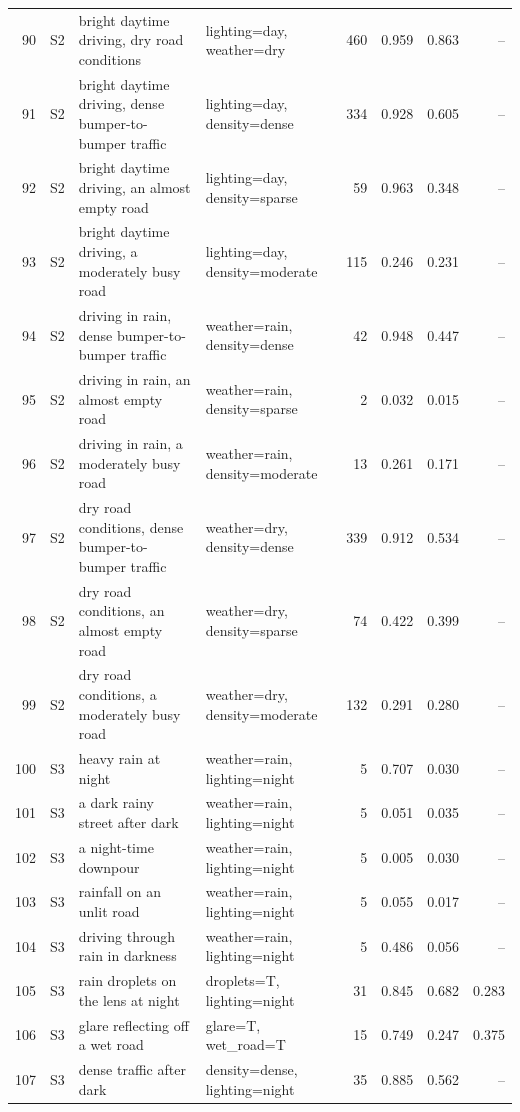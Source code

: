 \begin{longtable}{r l p{5.0cm} p{3.4cm} r r r r}
90 & S2 & bright daytime driving, dry road conditions & lighting=day, weather=dry & 460 & 0.959 & 0.863 & --\\
91 & S2 & bright daytime driving, dense bumper-to-bumper traffic & lighting=day, density=dense & 334 & 0.928 & 0.605 & --\\
92 & S2 & bright daytime driving, an almost empty road & lighting=day, density=sparse & 59 & 0.963 & 0.348 & --\\
93 & S2 & bright daytime driving, a moderately busy road & lighting=day, density=moderate & 115 & 0.246 & 0.231 & --\\
94 & S2 & driving in rain, dense bumper-to-bumper traffic & weather=rain, density=dense & 42 & 0.948 & 0.447 & --\\
95 & S2 & driving in rain, an almost empty road & weather=rain, density=sparse & 2 & 0.032 & 0.015 & --\\
96 & S2 & driving in rain, a moderately busy road & weather=rain, density=moderate & 13 & 0.261 & 0.171 & --\\
97 & S2 & dry road conditions, dense bumper-to-bumper traffic & weather=dry, density=dense & 339 & 0.912 & 0.534 & --\\
98 & S2 & dry road conditions, an almost empty road & weather=dry, density=sparse & 74 & 0.422 & 0.399 & --\\
99 & S2 & dry road conditions, a moderately busy road & weather=dry, density=moderate & 132 & 0.291 & 0.280 & --\\
100 & S3 & heavy rain at night & weather=rain, lighting=night & 5 & 0.707 & 0.030 & --\\
101 & S3 & a dark rainy street after dark & weather=rain, lighting=night & 5 & 0.051 & 0.035 & --\\
102 & S3 & a night-time downpour & weather=rain, lighting=night & 5 & 0.005 & 0.030 & --\\
103 & S3 & rainfall on an unlit road & weather=rain, lighting=night & 5 & 0.055 & 0.017 & --\\
104 & S3 & driving through rain in darkness & weather=rain, lighting=night & 5 & 0.486 & 0.056 & --\\
105 & S3 & rain droplets on the lens at night & droplets=T, lighting=night & 31 & 0.845 & 0.682 & 0.283\\
106 & S3 & glare reflecting off a wet road & glare=T, wet\_road=T & 15 & 0.749 & 0.247 & 0.375\\
107 & S3 & dense traffic after dark & density=dense, lighting=night & 35 & 0.885 & 0.562 & --\\

\end{longtable}
